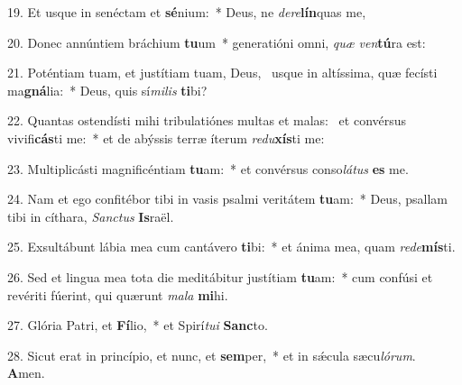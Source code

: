 19. Et usque in senéctam et \textbf{sé}nium:~*  Deus, ne \textit{de}\textit{re}\textbf{lín}quas me,\

20. Donec annúntiem bráchium \textbf{tu}um~*  generatióni omni, \textit{quæ} \textit{ven}\textbf{tú}ra est:\

21. Poténtiam tuam, et justítiam tuam, Deus, \dag\  usque in altíssima, quæ fecísti ma\textbf{gná}lia:~*  Deus, quis sí\textit{mi}\textit{lis} \textbf{ti}bi?\

22. Quantas ostendísti mihi tribulatiónes multas et malas: \dag\  et convérsus vivifi\textbf{cás}ti me:~*  et de abýssis terræ íterum \textit{re}\textit{du}\textbf{xís}ti me:\

23. Multiplicásti magnificéntiam \textbf{tu}am:~*  et convérsus conso\textit{lá}\textit{tus} \textbf{es} me.\

24. Nam et ego confitébor tibi in vasis psalmi veritátem \textbf{tu}am:~*  Deus, psallam tibi in cíthara, \textit{Sanc}\textit{tus} \textbf{Is}raël.\

25. Exsultábunt lábia mea cum cantávero \textbf{ti}bi:~*  et ánima mea, quam \textit{red}\textit{e}\textbf{mís}ti.\

26. Sed et lingua mea tota die meditábitur justítiam \textbf{tu}am:~*  cum confúsi et revériti fúerint, qui quærunt \textit{ma}\textit{la} \textbf{mi}hi.\

27. Glória Patri, et \textbf{Fí}lio,~*  et Spirí\textit{tu}\textit{i} \textbf{Sanc}to.\

28. Sicut erat in princípio, et nunc, et \textbf{sem}per,~*  et in sǽcula sæcu\textit{ló}\textit{rum}. \textbf{A}men.\

